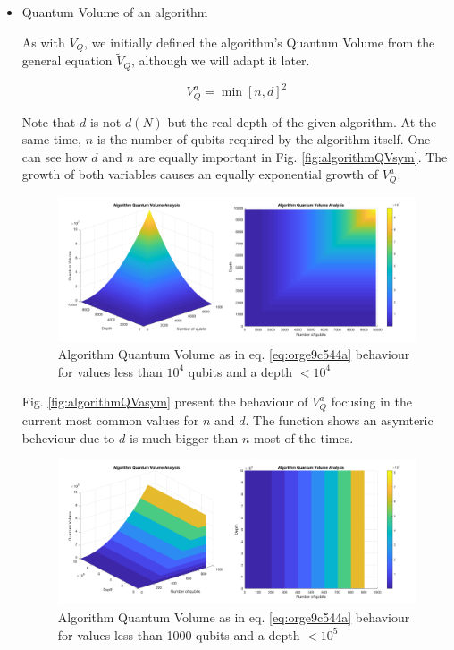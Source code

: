 \begin{itemize}
\begin{itemize}
\begin{itemize}
\item Quantum Volume of an algorithm
\label{sec:org916abb0}

As with \(V_Q\), we initially defined the algorithm's Quantum Volume from the general equation \(\tilde{V}_Q\), although we will adapt it later.

\begin{equation}
\label{eq:orge9c544a}
V_Q^a = \min \left[ n,d \right]^2
\end{equation}

Note that \(d\) is not \(d(N)\) but the real depth of the given algorithm.
At the same time, \(n\) is the number of qubits required by the algorithm itself.
One can see how \(d\) and \(n\) are equally important in Fig. \ref{fig:algorithmQVsym}.
The growth of both variables causes an equally exponential growth of \(V^a_Q\).

\begin{figure}[htbp]
\centering
\includegraphics[width=\textwidth]{figures/V_q_analysis_sym.png}
\caption{\label{fig:orgd865f0a}
Algorithm Quantum Volume as in eq. \ref{eq:orge9c544a} behaviour for values less than \(10^{4}\) qubits and a depth \(< 10^{4}\)}
\end{figure}

Fig. \ref{fig:algorithmQVasym} present the behaviour of \(V_Q^a\)
focusing in the current most common values for \(n\) and \(d\).
The function shows an asymteric beheviour due to \(d\) is much bigger than \(n\) most of the times.


\begin{figure}[htbp]
\centering
\includegraphics[width=\textwidth]{figures/V_q_analysis_asym.png}
\caption{\label{fig:org4e311f7}
Algorithm Quantum Volume as in eq. \ref{eq:orge9c544a} behaviour for values less than 1000 qubits and a depth \(< 10^{5}\)}
\end{figure}


\end{itemize}
\end{itemize}
\end{itemize}

